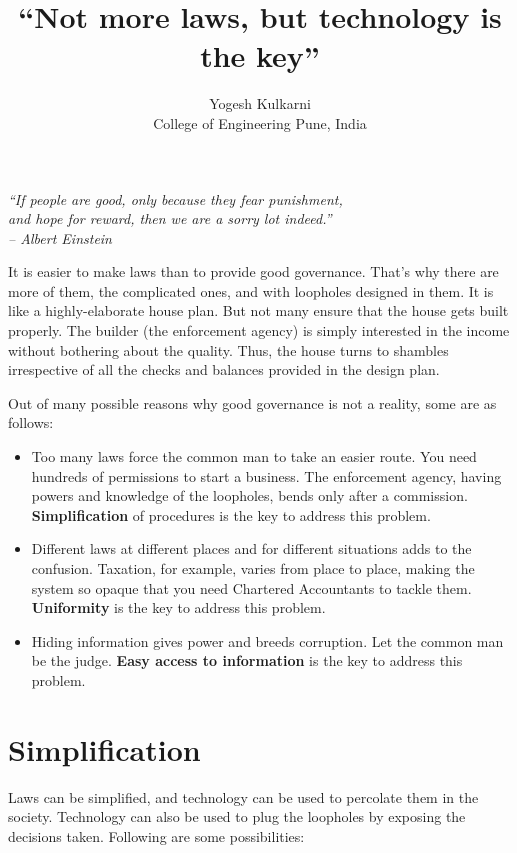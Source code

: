 \documentclass[12pt]{article}
\title{``Not more laws, but technology is the key''} %
\author{Yogesh Kulkarni\\College of Engineering Pune, India} %
\date{} %
\begin{document}
\maketitle


\begin{flushright}
{\em ``If people are good, only because they fear punishment, \\and hope for reward, then we are a sorry lot indeed.'' \\– Albert Einstein}
\end{flushright}


It is easier to make laws than to provide good governance. That's why there are more of them, the complicated ones, and with loopholes designed in them. It is like a highly-elaborate house plan. But not many ensure that the house gets built properly. The builder (the enforcement agency) is simply interested in the income without bothering  about the quality. Thus, the house turns to shambles irrespective of all the checks and balances provided in the design plan. 

Out of many possible reasons why good governance is not a reality, some are  as follows:

\begin{itemize}[label=\textbullet, noitemsep,nolistsep]
\item Too many laws force the common man to take an easier route. You need hundreds of permissions to start a business. The enforcement agency, having powers and knowledge of the loopholes,  bends only after a commission. \textbf{Simplification} of procedures is the key to address this problem.

\item Different laws at different places and for different situations adds to the confusion. Taxation, for example, varies from place to place, making the system so opaque that you need Chartered Accountants to tackle them. \textbf{Uniformity} is the key to address this problem.

\item Hiding information gives power and breeds corruption. Let the common man be the judge.  \textbf{Easy access to information} is the key to address this problem.
\end{itemize}

\section*{Simplification}
Laws can be simplified, and technology can be used to percolate them in the society. Technology can also be used to plug the loopholes by exposing the decisions taken. Following are some possibilities:
\end{document}
